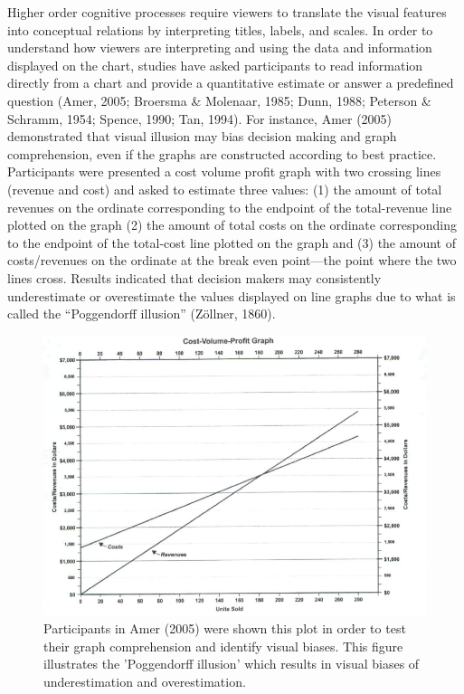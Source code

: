\documentclass[print]{nuthesis}
\begin{document}
Higher order cognitive processes require viewers to translate the visual features into conceptual relations by interpreting titles, labels, and scales.
In order to understand how viewers are interpreting and using the data and information displayed on the chart, studies have asked participants to read information directly from a chart and provide a quantitative estimate or answer a predefined question (Amer, 2005; Broersma \& Molenaar, 1985; Dunn, 1988; Peterson \& Schramm, 1954; Spence, 1990; Tan, 1994).
For instance, Amer (2005) demonstrated that visual illusion may bias decision making and graph comprehension, even if the graphs are constructed according to best practice.
Participants were presented a cost volume profit graph  with two crossing lines (revenue and cost) and asked to estimate three values: (1) the amount of total revenues on the ordinate corresponding to the endpoint of the total-revenue line plotted on the graph (2) the amount of total costs on the ordinate corresponding to the endpoint of the total-cost line plotted on the graph and (3) the amount of costs/revenues on the ordinate at the break even point---the point where the two lines cross.
Results indicated that decision makers may consistently underestimate or overestimate the values displayed on line graphs due to what is called the ``Poggendorff illusion'' (Zöllner, 1860).

\begin{figure}[tbp]

{\centering \includegraphics[width=1\linewidth,]{images/amer-poggendorff-illusion} 

}

\caption[Amer (2005) cost volume profit graph]{Participants in Amer (2005) were shown this plot in order to test their graph comprehension and identify visual biases. This figure illustrates the 'Poggendorff illusion' which results in visual biases of underestimation and overestimation.}\label{fig:amer-poggendorff-illusion}
\end{figure}
\end{document}
